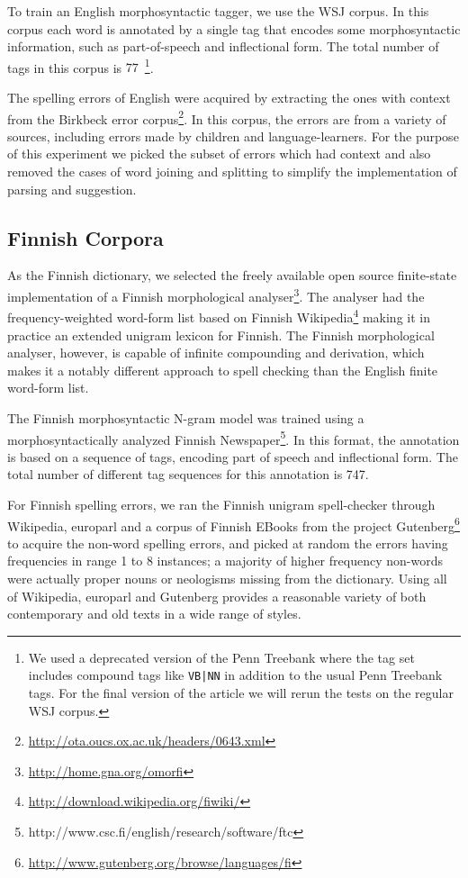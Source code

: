 \documentclass{llncs}
\begin{document}
To train an English morphosyntactic tagger, we use the WSJ corpus. In
this corpus each word is annotated by a single tag that encodes some
morphosyntactic information, such as part-of-speech and inflectional
form.  The total number of tags in this corpus is $77$~\footnote{We
  used a deprecated version of the Penn Treebank where the tag set
  includes compound tags like {\tt VB|NN} in addition to the usual
  Penn Treebank tags. For the final version of the article we will
  rerun the tests on the regular WSJ corpus.}.

The spelling errors of English were acquired by extracting the ones with
context from the Birkbeck error
corpus\footnote{\url{http://ota.oucs.ox.ac.uk/headers/0643.xml}}. In this
corpus, the errors are from a variety of sources, including errors made by
children and language-learners. For the purpose of this experiment we picked
the subset of errors which had context and also removed the cases of word
joining and splitting to simplify the implementation of parsing and suggestion.

\subsection{Finnish Corpora}

As the Finnish dictionary, we selected the freely available open source
finite-state implementation of a Finnish morphological
analyser\footnote{\url{http://home.gna.org/omorfi}}. The analyser had the
frequency-weighted word-form list based on Finnish
Wikipedia\footnote{\url{http://download.wikipedia.org/fiwiki/}} making it in
practice an extended unigram lexicon for Finnish. The Finnish morphological
analyser, however, is capable of infinite compounding and derivation, which
makes it a notably different approach to spell checking than the English finite
word-form list. 

The Finnish morphosyntactic N-gram model was trained using a
morphosyntactically analyzed Finnish
Newspaper\footnote{http://www.csc.fi/english/research/software/ftc}. In
this format, the annotation is based on a sequence of tags, encoding
part of speech and inflectional form. The total number of different
tag sequences for this annotation is 747.

For Finnish spelling errors, we ran the Finnish unigram spell-checker through
Wikipedia, europarl and a corpus of Finnish EBooks from the project
Gutenberg\footnote{\url{http://www.gutenberg.org/browse/languages/fi}} to
acquire the non-word spelling errors, and picked at random the errors having
frequencies in range 1 to 8 instances; a majority of higher frequency non-words
were actually proper nouns or neologisms missing from the dictionary. Using all of
Wikipedia, europarl and Gutenberg provides a reasonable variety of both
contemporary and old texts in a wide range of styles.
\end{document}
